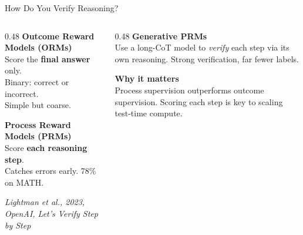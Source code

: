 \documentclass[aspectratio=169, 12pt, xcolor=dvipsnames]{beamer}
\newcommand{\papercite}[4]{\emph{#1, #2, #3, #4}}
\begin{document}
\begin{frame}{How Do You Verify Reasoning?}

\begin{columns}[T]
  \begin{column}{0.48\textwidth}
    \textbf{Outcome Reward Models (ORMs)}\\[0.3em]
    {\small Score the \textbf{final answer} only.\\
    Binary: correct or incorrect.\\
    Simple but coarse.}

    \vspace{1em}
    \textbf{Process Reward Models (PRMs)}\\[0.3em]
    {\small Score \textbf{each reasoning step}.\\
    Catches errors early. 78\% on MATH.}

    \vspace{0.3em}
    {\scriptsize \papercite{Lightman et al.}{2023}{OpenAI}{Let's Verify Step by Step}}
  \end{column}
  \begin{column}{0.48\textwidth}
    \textbf{Generative PRMs}\\[0.3em]
    {\small Use a long-CoT model to \emph{verify}
    each step via its own reasoning.
    Strong verification, far fewer labels.}

    \vspace{0.8em}
    \textbf{Why it matters}\\[0.3em]
    {\small Process supervision outperforms outcome
    supervision. Scoring each step is key to
    scaling test-time compute.}
  \end{column}
\end{columns}

\end{frame}
\end{document}
